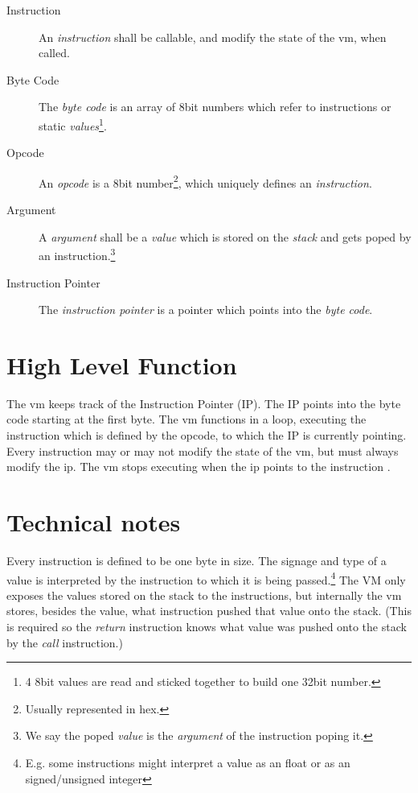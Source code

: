 \documentclass[10pt,a4paper]{article}
\begin{document}
\begin{description}
		\item[Instruction] An \textit{instruction} shall be callable, and modify the state of the vm, when called.
			
		\item[Byte Code] The \textit{byte code} is an array of 8bit numbers which refer to instructions or static \textit{values}\footnote{4 8bit values are read and sticked together to build one 32bit number.}.	
		
		\item[Opcode] An \textit{opcode} is a 8bit number\footnote{Usually represented in hex.}, which uniquely defines an \textit{instruction}.
		
 		\item[Argument]A \textit{argument} shall be a \textit{value} which is stored on the \textit{stack} and gets poped by an instruction.\footnote{We say the poped \textit{value} is the \textit{argument} of the instruction poping it.}
 		
		\item[Instruction Pointer] The \textit{instruction pointer} is a pointer which points into the \textit{byte code}. 		
 		

	\end{description}
	\section{High Level Function}
	\label{high_level_function}	
	
	The vm keeps track of the Instruction Pointer (IP). The IP points into the byte code starting at the first byte. The vm functions in a loop, executing the instruction which is defined by the opcode, to which the IP is currently pointing. Every instruction may or may not modify the state of the vm, but must always modify the ip. The vm stops executing when the ip points to the instruction .
	
	\section{Technical notes}
	\label{technical_notes}	
	Every instruction is defined to be one byte in size. The signage and type of a value is interpreted by the instruction to which it is being passed.\footnote{E.g. some instructions might interpret a value as an float or as an signed/unsigned integer} The VM only exposes the values stored on the stack to the instructions, but internally the vm stores, besides the value, what instruction pushed that value onto the stack. (This is required so the \textit{return} instruction knows what value was pushed onto the stack by the \textit{call} instruction.)
	
\end{document}
